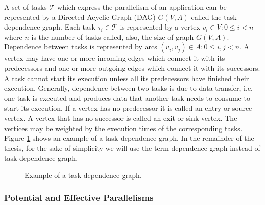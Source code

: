 A set of tasks $\mathcal{T}$ which express the parallelism of an application can be represented by a Directed Acyclic Graph (DAG) $G(V,A)$ called the task dependence graph. Each task $\tau_i \in \mathcal{T}$ is represented by a vertex $v_i \in V: 0 \leq i < n$ where $n$ is the number of tasks called, also, the size of graph $G(V,A)$. Dependence between tasks is represented by arcs $(v_i, v_j) \in A: 0 \leq i,j < n$. A vertex may have one or more incoming edges which connect it with its predecessors and one or more outgoing edges which connect it with its successors. A task cannot start its execution unless all its predecessors have finished their execution. Generally, dependence between two tasks is due to data transfer, i.e. one task is executed and produces data that another task needs to consume to start its execution. If a vertex has no predecessor it is called an entry or source vertex. A vertex that has no successor is called an exit or sink vertex. The vertices may be weighted by the execution times of the corresponding tasks. Figure \ref{fig:dagex} shows an example of a task dependence graph. In the remainder of the thesis, for the sake of simplicity we will use the term dependence graph instead of task dependence graph.

%

\begin{figure}[phbt]
\centering

\caption{Example of a task dependence graph.}
\label{fig:dagex}
\end{figure} 

\subsubsection{Potential and Effective Parallelisms}

